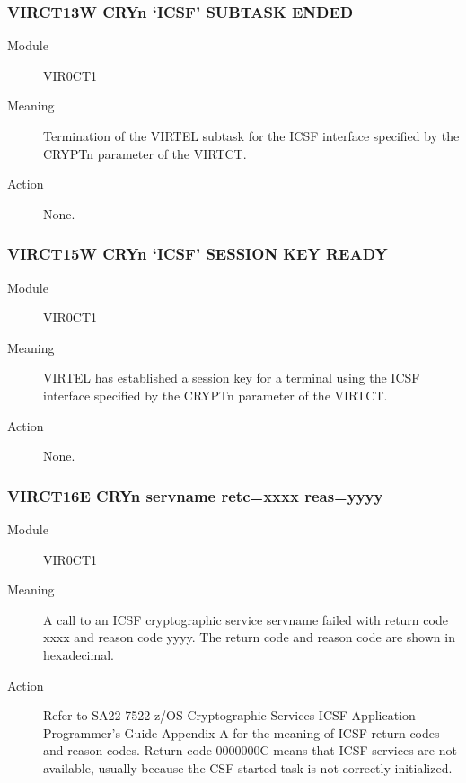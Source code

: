 \documentclass[letterpaper,10pt,english]{sphinxmanual}
\begin{document}
\subsubsection{VIRCT13W CRYn ‘ICSF’ SUBTASK ENDED}
\label{\detokenize{messages:virct13w-cryn-icsf-subtask-ended}}\begin{description}
\item[{Module}] \leavevmode
VIR0CT1

\item[{Meaning}] \leavevmode
Termination of the VIRTEL subtask for the ICSF interface specified by the CRYPTn parameter of the VIRTCT.

\item[{Action}] \leavevmode
None.

\end{description}


\subsubsection{VIRCT15W CRYn ‘ICSF’ SESSION KEY READY}
\label{\detokenize{messages:virct15w-cryn-icsf-session-key-ready}}\begin{description}
\item[{Module}] \leavevmode
VIR0CT1

\item[{Meaning}] \leavevmode
VIRTEL has established a session key for a terminal using the ICSF interface specified by the CRYPTn parameter of the VIRTCT.

\item[{Action}] \leavevmode
None.

\end{description}


\subsubsection{VIRCT16E CRYn  servname retc=xxxx reas=yyyy}
\label{\detokenize{messages:virct16e-cryn-error-servname-retc-xxxx-reas-yyyy}}\begin{description}
\item[{Module}] \leavevmode
VIR0CT1

\item[{Meaning}] \leavevmode
A call to an ICSF cryptographic service servname failed with return code xxxx and reason code yyyy. The return code and reason code are shown in hexadecimal.

\item[{Action}] \leavevmode
Refer to SA22-7522 z/OS Cryptographic Services ICSF Application Programmer’s Guide Appendix A for the meaning of ICSF return codes and reason codes. Return code 0000000C means that ICSF services are not available, usually because the CSF started task is not correctly initialized.

\end{description}
\end{document}
